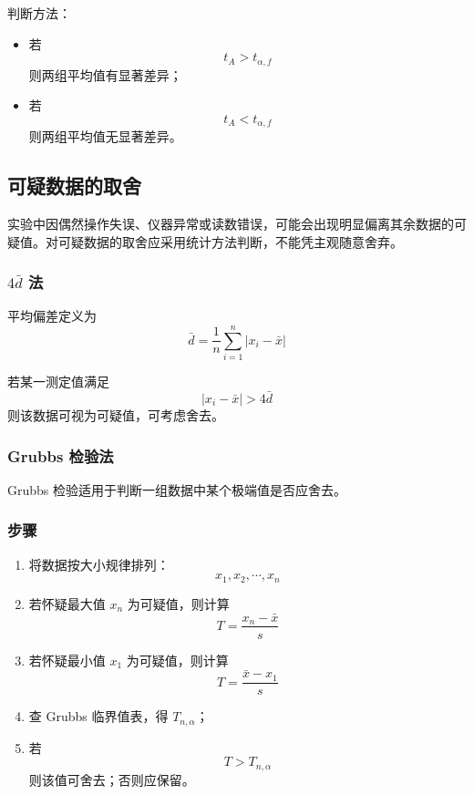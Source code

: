 \documentclass[12pt,a4paper]{article}
\numberwithin{equation}{section}
\begin{document}
判断方法：
\begin{itemize}
    \item 若
\begin{equation}
    t_A>t_{\alpha,f}
\end{equation}
    则两组平均值有显著差异；
    \item 若
\begin{equation}
    t_A<t_{\alpha,f}
\end{equation}
    则两组平均值无显著差异。
\end{itemize}

\subsection{可疑数据的取舍}

实验中因偶然操作失误、仪器异常或读数错误，可能会出现明显偏离其余数据的可疑值。对可疑数据的取舍应采用统计方法判断，不能凭主观随意舍弃。

\subsubsection{$4\bar{d}$ 法}

平均偏差定义为
\begin{equation}
\bar{d}=\frac{1}{n}\sum_{i=1}^{n}|x_i-\bar{x}|
\end{equation}

若某一测定值满足
\begin{equation}
|x_i-\bar{x}|>4\bar{d}
\end{equation}
则该数据可视为可疑值，可考虑舍去。

\subsubsection{Grubbs 检验法}

Grubbs 检验适用于判断一组数据中某个极端值是否应舍去。

\subsubsection*{步骤}

\begin{enumerate}
    \item 将数据按大小规律排列：
\begin{equation}
    x_1,x_2,\cdots,x_n
\end{equation}
    \item 若怀疑最大值 $x_n$ 为可疑值，则计算
\begin{equation}
    T=\frac{x_n-\bar{x}}{s}
\end{equation}
    \item 若怀疑最小值 $x_1$ 为可疑值，则计算
\begin{equation}
    T=\frac{\bar{x}-x_1}{s}
\end{equation}
    \item 查 Grubbs 临界值表，得 $T_{n,\alpha}$；
    \item 若
\begin{equation}
    T>T_{n,\alpha}
\end{equation}
    则该值可舍去；否则应保留。
\end{enumerate}
\end{document}
